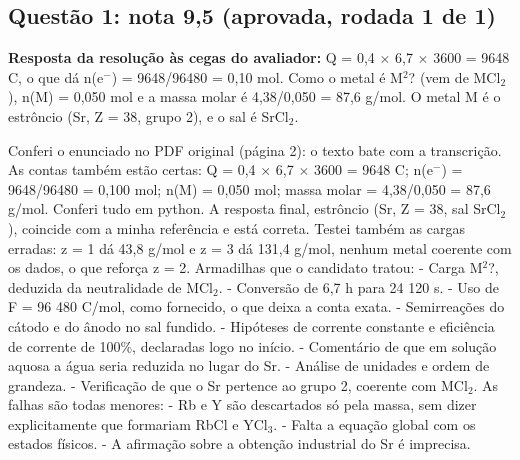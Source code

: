 \documentclass{article}%
\begin{document}
\subsection*{Questão 1: nota 9,5 (aprovada, rodada 1 de 1)}%
\textbf{Resposta da resolução às cegas do avaliador:} Q = 0,4 $\times$ 6,7 $\times$ 3600 = 9648 C, o que dá n(e$^{-}$) = 9648/96480 = 0,10 mol. Como o metal é M$^2$? (vem de MCl$_{2}$), n(M) = 0,050 mol e a massa molar é 4,38/0,050 = 87,6 g/mol. O metal M é o estrôncio (Sr, Z = 38, grupo 2), e o sal é SrCl$_{2}$.\par %
Conferi o enunciado no PDF original (página 2): o texto bate com a transcrição. As contas também estão certas: Q = 0,4 $\times$ 6,7 $\times$ 3600 = 9648 C; n(e$^{-}$) = 9648/96480 = 0,100 mol; n(M) = 0,050 mol; massa molar = 4,38/0,050 = 87,6 g/mol. Conferi tudo em python. A resposta final, estrôncio (Sr, Z = 38, sal SrCl$_{2}$), coincide com a minha referência e está correta. Testei também as cargas erradas: z = 1 dá 43,8 g/mol e z = 3 dá 131,4 g/mol, nenhum metal coerente com os dados, o que reforça z = 2.\newline%
\newline%
Armadilhas que o candidato tratou:\newline%
{-} Carga M$^2$?, deduzida da neutralidade de MCl$_{2}$.\newline%
{-} Conversão de 6,7 h para 24 120 s.\newline%
{-} Uso de F = 96 480 C/mol, como fornecido, o que deixa a conta exata.\newline%
{-} Semirreações do cátodo e do ânodo no sal fundido.\newline%
{-} Hipóteses de corrente constante e eficiência de corrente de 100\%, declaradas logo no início.\newline%
{-} Comentário de que em solução aquosa a água seria reduzida no lugar do Sr.\newline%
{-} Análise de unidades e ordem de grandeza.\newline%
{-} Verificação de que o Sr pertence ao grupo 2, coerente com MCl$_{2}$.\newline%
\newline%
As falhas são todas menores:\newline%
{-} Rb e Y são descartados só pela massa, sem dizer explicitamente que formariam RbCl e YCl$_{3}$.\newline%
{-} Falta a equação global com os estados físicos.\newline%
{-} A afirmação sobre a obtenção industrial do Sr é imprecisa.\newline%
\end{document}
